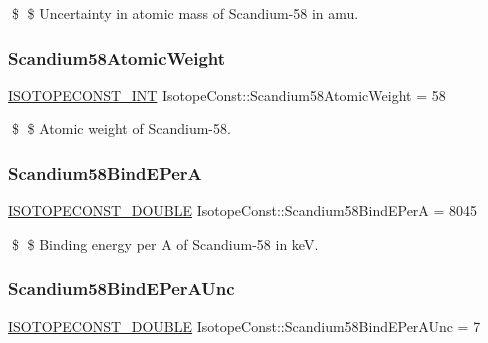 \$ \$ Uncertainty in atomic mass of Scandium-\/58 in amu. \mbox{\label{group___isotope_const-_scandium-_sc58_gaa78ed340638627e1224a96abd013d3d8}} 
\subsubsection{\texorpdfstring{Scandium58\+Atomic\+Weight}{Scandium58AtomicWeight}}
{\footnotesize\ttfamily \mbox{\hyperlink{group___isotope_const-_macros_ga5f18360b3e99483a35c32d789e62621c}{I\+S\+O\+T\+O\+P\+E\+C\+O\+N\+S\+T\+\_\+\+I\+NT}} Isotope\+Const\+::\+Scandium58\+Atomic\+Weight = 58}

\$ \$ Atomic weight of Scandium-\/58. \mbox{\label{group___isotope_const-_scandium-_sc58_gae45013e0ba92125b5a73f227c3e86806}} 
\subsubsection{\texorpdfstring{Scandium58\+Bind\+E\+PerA}{Scandium58BindEPerA}}
{\footnotesize\ttfamily \mbox{\hyperlink{group___isotope_const-_macros_ga8f45a7272ce02c0b4c65c44636ed719a}{I\+S\+O\+T\+O\+P\+E\+C\+O\+N\+S\+T\+\_\+\+D\+O\+U\+B\+LE}} Isotope\+Const\+::\+Scandium58\+Bind\+E\+PerA = 8045}

\$ \$ Binding energy per A of Scandium-\/58 in keV. \mbox{\label{group___isotope_const-_scandium-_sc58_ga8482eb0d972b3b60b7bbe3709dd2d8e7}} 
\subsubsection{\texorpdfstring{Scandium58\+Bind\+E\+Per\+A\+Unc}{Scandium58BindEPerAUnc}}
{\footnotesize\ttfamily \mbox{\hyperlink{group___isotope_const-_macros_ga8f45a7272ce02c0b4c65c44636ed719a}{I\+S\+O\+T\+O\+P\+E\+C\+O\+N\+S\+T\+\_\+\+D\+O\+U\+B\+LE}} Isotope\+Const\+::\+Scandium58\+Bind\+E\+Per\+A\+Unc = 7}

